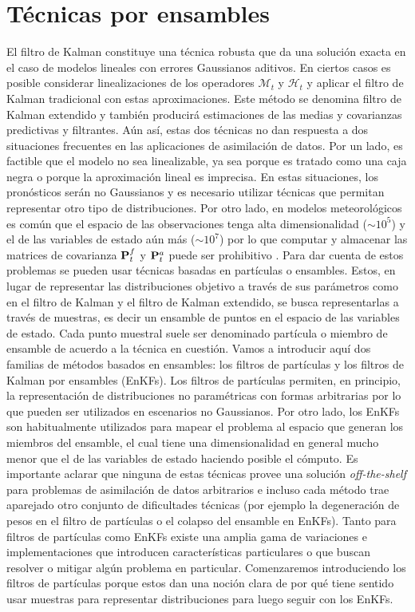 \section{Técnicas por ensambles}
El filtro de Kalman constituye una técnica robusta que da una solución exacta en el caso de modelos lineales con errores Gaussianos aditivos. En ciertos casos es posible considerar linealizaciones de los operadores $\mathcal{M}_t$ y $\mathcal{H}_t$ y aplicar el filtro de Kalman tradicional con estas aproximaciones. Este método se denomina filtro de Kalman extendido y también producirá estimaciones de las medias y covarianzas predictivas y filtrantes. Aún así, estas dos técnicas no dan respuesta a dos situaciones frecuentes en las aplicaciones de asimilación de datos. Por un lado, es factible que el modelo no sea linealizable, ya sea porque es tratado como una caja negra o porque la aproximación lineal es imprecisa. En estas situaciones, los pronósticos serán no Gaussianos y es necesario utilizar técnicas que permitan representar otro tipo de distribuciones. Por otro lado, en modelos meteorológicos es común que el espacio de las observaciones tenga alta dimensionalidad ($\sim 10^5$) y el de las variables de estado aún más ($\sim 10^7$) por lo que computar y almacenar las matrices de covarianza $\mathbf{P}_t^f$ y $\mathbf{P}_t^a$ puede ser prohibitivo \citep{Katzfuss2016}. Para dar cuenta de estos problemas se pueden usar técnicas basadas en partículas o ensambles. Estos, en lugar de representar las distribuciones objetivo a través de sus parámetros como en el filtro de Kalman y el filtro de Kalman extendido, se busca representarlas a través de muestras, es decir un ensamble de puntos en el espacio de las variables de estado. Cada punto muestral suele ser denominado partícula o miembro de ensamble de acuerdo a la técnica en cuestión. Vamos a introducir aquí dos familias de métodos basados en ensambles: los filtros de partículas y los filtros de Kalman por ensambles (EnKFs). Los filtros de partículas permiten, en principio, la representación de distribuciones no paramétricas con formas arbitrarias por lo que pueden ser utilizados en escenarios no Gaussianos. Por otro lado, los EnKFs son habitualmente utilizados para mapear el problema al espacio que generan los miembros del ensamble, el cual tiene una dimensionalidad en general mucho menor que el de las variables de estado haciendo posible el cómputo. Es importante aclarar que ninguna de estas técnicas provee una solución \textit{off-the-shelf} para problemas de asimilación de datos arbitrarios e incluso cada método trae aparejado otro conjunto de dificultades técnicas (por ejemplo la degeneración de pesos en el filtro de partículas o el colapso del ensamble en EnKFs). Tanto para filtros de partículas como EnKFs existe una amplia gama de variaciones e implementaciones que introducen características particulares o que buscan resolver o mitigar algún problema en particular. Comenzaremos introduciendo los filtros de partículas porque estos dan una noción clara de por qué tiene sentido usar muestras para representar distribuciones para luego seguir con los EnKFs.

